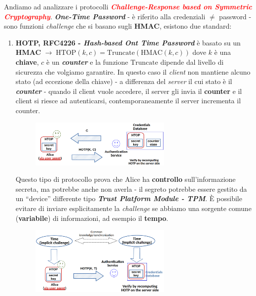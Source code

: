 \begin{flushleft}
    Andiamo ad analizzare i protocolli \textcolor{red}{\textbf{\textit{Challenge-Response based on Symmetric Cryptography}}}. \textbf{\textit{One-Time Password}} - è riferito alla credenziali $\neq$ password - sono funzioni \textit{challenge} che si basano sugli \textbf{HMAC}, esistono due standard:
    \begin{enumerate}[nosep]
        \item \textbf{HOTP, RFC4226 - \textit{Hash-based Ont Time Password}} è basato su un \textbf{HMAC} $\rightarrow \; \text{HTOP}(k, c) = \text{Truncate}(\text{HMAC}(k, c))$ dove $k$ è una \textbf{chiave}, $c$ è un \textbf{\textit{counter}} e la funzione $\text{Truncate}$ dipende dal livello di sicurezza che volgiamo garantire. In questo caso il \textit{client} non mantiene alcuno stato (ad eccezione della chiave) - a differenza del \textit{server} il cui stato è il \textbf{\textit{counter}} - quando il client vuole accedere, il server gli invia il \textbf{counter} e il client si riesce ad autenticarsi, contemporaneamente il server incrementa il counter.

        \begin{figure}[h]
            \centering
            \includegraphics[width=0.65\textwidth]{img/hotp.png}
        \end{figure}

        Questo tipo di protocollo prova che Alice ha \textbf{controllo} sull'informazione secreta, ma potrebbe anche non averla - il segreto potrebbe essere gestito da un ``device'' differente tipo \textbf{\textit{Trust Platform Module - TPM}}. È possibile evitare di inviare esplicitamente la \textit{challenge} se abbiamo una sorgente comune (\textbf{variabile}) di informazioni, ad esempio il \textbf{tempo}.

        \begin{figure}[h]
            \centering
            \includegraphics[width=0.65\textwidth]{img/hotp_1.png}
        \end{figure}


\end{enumerate}
\end{flushleft}
